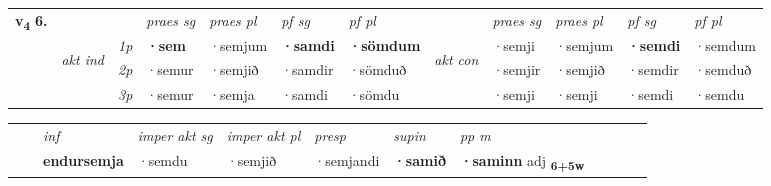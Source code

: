 \begin{tabular}{llllllllllll} \toprule
\multirow{4}{*}{{{\textbf{v{\textsubscript{4}}} \Large{\textbf{6.}}}}}  & &   &  \textit{praes sg}  & \textit{praes pl}  &\textit{ pf sg} & \textit{pf pl} &  &  \textit{praes sg}  & \textit{praes pl}  & \textit{pf sg} & \textit{pf pl } \\*
	\cmidrule{4-7} \cmidrule{9-12}
 & \multirow{3}{*}{\begin{turn}{90}\textit{akt ind}\end{turn}} & {\textit{1p}} & \textbf{·sem} & ·semjum    & \textbf{·samdi} & \textbf{·sömdum} & \multirow{3}{*}{\begin{turn}{90}\textit{akt con}\end{turn}} &·semji & ·semjum & \textbf{·semdi} & ·semdum\\*
& &  {\textit{2p}} &  ·semur  & ·semjið   & ·samdir & ·sömduð & & ·semjir & ·semjið & ·semdir & ·semduð \\*
& &  {\textit{3p}} & ·semur & ·semja   & ·samdi & ·sömdu & & ·semji & ·semji& ·semdi & ·semdu  \\*
\cmidrule{4-7} \cmidrule{9-12}
\end{tabular}


\begin{tabular}{llllllllllll}
 & & \textit{inf} & \textit{imper akt sg} & \textit{imper akt pl}   & \textit{presp} & \textit{supin}  & \textit{pp m}     \\*
  & & \textbf{endursemja} & ·semdu  & ·semjið   & ·semjandi &  \textbf{·samið}  & \textbf{·saminn} adj \textbf{\textsubscript{6+5w}} \\*
\cmidrule{1-12}
\end{tabular}



